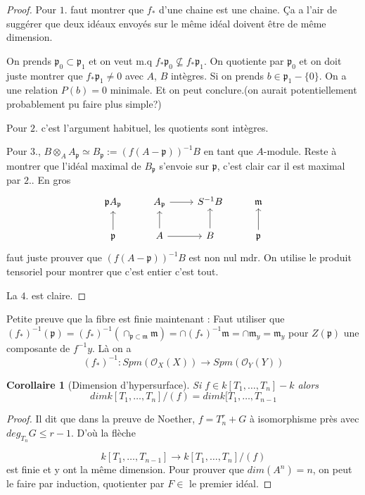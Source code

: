 \documentclass[a4paper,12pt]{book}
\newcommand{\Or}{\mathcal{O}}
\newcommand{\m}{\mathfrak{m}}
\newcommand{\p}{\mathfrak{p}}
\theoremstyle{plain}
\newtheorem{cor}[subsection]{Corollaire}
\theoremstyle{definition}
\theoremstyle{remark}
\begin{document}
\begin{proof}
    Pour $1.$ faut montrer que $f_*$ d'une chaine est une chaine.
    Ça a l'air de suggérer que deux idéaux envoyés sur le même idéal
    doivent être de même dimension.


    On prends $\p_0\subset \p_1$ et on veut m.q 
    $f_*\p_0\nsubseteq f_*\p_1$. On quotiente par $\p_0$ et on doit
    juste montrer que $f_* \p_1\ne 0$ avec $A$, $B$ intègres. Si 
    on prends $b\in \p_1-\{0\}$. On a une relation $P(b)=0$ minimale.
    Et on peut conclure.(on aurait potentiellement probablement pu faire
    plus simple?)

    Pour $2.$ c'est l'argument habituel, les quotients sont intègres.

    Pour $3.$, $B\otimes_A A_{\p}\simeq B_{\p}:=(f(A-\p))^{-1}B$ en tant
    que $A$-module. Reste à montrer que l'idéal maximal de $B_{\p}$
    s'envoie sur $\p$, c'est clair car il est maximal par $2.$. En gros
\[\begin{tikzcd}
	{\p A_{\p}} & {A_{\p}} & {S^{-1}B} & \m \\
	\p & A & B & \p
	\arrow[from=1-2, to=1-3]
	\arrow[from=2-1, to=1-1]
	\arrow[from=2-2, to=1-2]
	\arrow[from=2-2, to=2-3]
	\arrow[from=2-3, to=1-3]
	\arrow[from=2-4, to=1-4]
\end{tikzcd}\]
    faut juste prouver que $(f(A-\p))^{-1}B$ est non nul mdr. On utilise
    le produit tensoriel pour montrer que c'est entier c'est tout.

    La $4.$ est claire.
\end{proof}

Petite preuve que la fibre est finie maintenant : Faut utiliser
que $(f_*)^{-1}(\p)=(f_*)^{-1}(\cap_{\p\subset\m}\m)=\cap (f_*)^{-1}\m =
\cap \m_y=\m_y$ pour $Z(\p)$ une composante de $f^{-1}y$. Là on a 
\[(f_*)^{-1}\colon Spm(\Or_X(X))\to Spm(\Or_Y(Y))\]

\begin{cor}[Dimension d'hypersurface]
    Si $f\in k[T_1,\ldots,T_n]-k$ alors
    \[dim k[T_1,\ldots,T_n]/(f)=dim k[T_1,\ldots, T_{n-1}\]
\end{cor}
\begin{proof}
    Il dit que dans la preuve de Noether, $f=T_n^r+G$ à isomorphisme
    près avec $deg_{T_n}G\leq r-1$. D'où la flèche 

    \[k[T_1,\ldots,T_{n-1}]\to k[T_1,\ldots, T_n]/(f)\]
    est finie et y ont la même dimension. Pour prouver que 
    $dim(A^n)=n$, on peut le faire par induction, quotienter par $F\in$
    le premier idéal. 
\end{proof}
\end{document}
